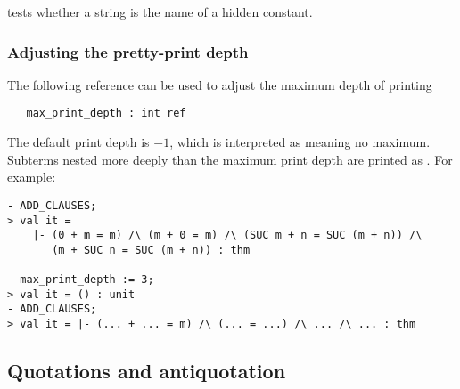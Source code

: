\noindent tests whether a string is the name of a hidden constant.

\subsubsection{Adjusting the pretty-print depth}

The following \ML{} reference can be used to adjust the maximum depth
of printing

\begin{holboxed}
\begin{verbatim}
   max_print_depth : int ref
\end{verbatim}
\end{holboxed}


\noindent The default print depth is $-1$, which is interpreted as
meaning no maximum.  Subterms nested more deeply than the maximum
print depth are printed as . For example:

\setcounter{sessioncount}{0}
\begin{session}
\begin{verbatim}
- ADD_CLAUSES;
> val it =
    |- (0 + m = m) /\ (m + 0 = m) /\ (SUC m + n = SUC (m + n)) /\
       (m + SUC n = SUC (m + n)) : thm

- max_print_depth := 3;
> val it = () : unit
- ADD_CLAUSES;
> val it = |- (... + ... = m) /\ (... = ...) /\ ... /\ ... : thm
\end{verbatim}
\end{session}

\subsection{Quotations and antiquotation}
\label{sec:quotation-antiquotation}

